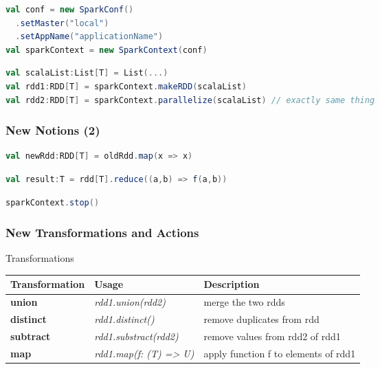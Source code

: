 \documentclass[slidetop,9pt,utf8]{beamer}
\begin{document}
\begin{CJK}{UTF8}{gbsn}
\begin{frame}[fragile]
  \begin{lstlisting}[label=InitSparkContext, caption=Init Spark Context, language=scala, style=code]
val conf = new SparkConf()
  .setMaster("local")
  .setAppName("applicationName")
val sparkContext = new SparkContext(conf)
  \end{lstlisting}

  \begin{lstlisting}[label=ListToRdd, caption=Load List as RDD, language=scala, style=code]
val scalaList:List[T] = List(...)
val rdd1:RDD[T] = sparkContext.makeRDD(scalaList)
val rdd2:RDD[T] = sparkContext.parallelize(scalaList) // exactly same thing
  \end{lstlisting}

\end{frame}

\begin{frame}[fragile]
  \frametitle{New Notions (2)}

  \begin{lstlisting}[label=RDDTransformation, caption=Apply transformation to RDD, language=scala, style=code]
val newRdd:RDD[T] = oldRdd.map(x => x)
  \end{lstlisting}

  \begin{lstlisting}[label=RDDAction, caption=Apply action to RDD, language=scala, style=code]
val result:T = rdd[T].reduce((a,b) => f(a,b))
  \end{lstlisting}

  \begin{lstlisting}[label=StopSparkContext, caption=Stop Spark Context, language=scala, style=code]
sparkContext.stop()
  \end{lstlisting}

\end{frame}

\begin{frame}

  \frametitle{New Transformations and Actions}

  \begin{block}{Transformations}
    \begin{center}
      \begin{tabular}{|m{2.1cm}|m{3.5cm}|m{5cm}|}
        \hline 
        \rowcolor{gray} \textbf{Transformation} & \textbf{Usage} & \textbf{Description} \\ \hline
        \textbf{union} & \textit{rdd1.union(rdd2)} & merge the two rdds \\ \hline
        \textbf{distinct} & \textit{rdd1.distinct()} & remove duplicates from rdd \\ \hline
        \textbf{subtract} & \textit{rdd1.substract(rdd2)} & remove values from rdd2 of rdd1 \\ \hline
        \textbf{map} & \textit{rdd1.map(f: (T) =\textgreater\xspace U)} & apply function f to elements of rdd1 \\ \hline
      \end{tabular}
    \end{center}
  \end{block}


\end{frame}
\end{CJK}
\end{document}
